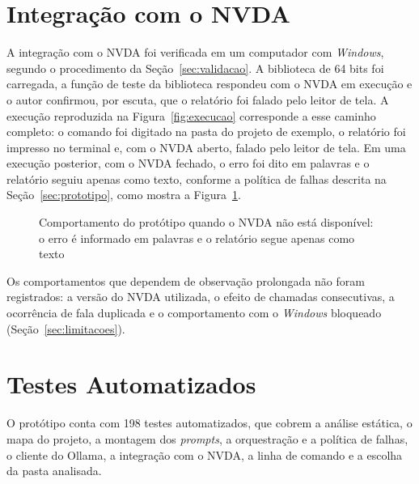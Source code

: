 \documentclass[
    12pt,                   %
    openright,              %
    oneside,                %
    a4paper,                %
    sumario=tradicional,    %
    english,                %
    brazil,                 %
    ]{abntex2}
\begin{document}
\section{Integração com o NVDA}\label{sec:resultnvda}

A integração com o NVDA foi verificada em um computador com \textit{Windows}, segundo o procedimento da Seção~\ref{sec:validacao}. A biblioteca de 64 bits foi carregada, a função de teste da biblioteca respondeu com o NVDA em execução e o autor confirmou, por escuta, que o relatório foi falado pelo leitor de tela. A execução reproduzida na Figura~\ref{fig:execucao} corresponde a esse caminho completo: o comando foi digitado na pasta do projeto de exemplo, o relatório foi impresso no terminal e, com o NVDA aberto, falado pelo leitor de tela. Em uma execução posterior, com o NVDA fechado, o erro foi dito em palavras e o relatório seguiu apenas como texto, conforme a política de falhas descrita na Seção~\ref{sec:prototipo}, como mostra a Figura~\ref{fig:semnvda}.

\begin{figure}[htbp]
  \centering
  \caption{Comportamento do protótipo quando o NVDA não está disponível: o erro é informado em palavras e o relatório segue apenas como texto}
  \label{fig:semnvda}
\end{figure}

Os comportamentos que dependem de observação prolongada não foram registrados: a versão do NVDA utilizada, o efeito de chamadas consecutivas, a ocorrência de fala duplicada e o comportamento com o \textit{Windows} bloqueado (Seção~\ref{sec:limitacoes}).

\section{Testes Automatizados}\label{sec:resulttestes}

O protótipo conta com 198 testes automatizados, que cobrem a análise estática, o mapa do projeto, a montagem dos \textit{prompts}, a orquestração e a política de falhas, o cliente do Ollama, a integração com o NVDA, a linha de comando e a escolha da pasta analisada.
\end{document}
